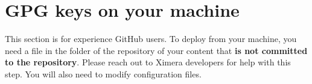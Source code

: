 \documentclass{ximera}
\begin{document}
\pdfOnly{\twocolumn} %

\section{GPG keys on your machine}

This section is for experience GitHub users. To deploy from your machine, you need a file in
the folder of the repository of
your content that \textbf{is not committed to the repository}. Please reach out
to Ximera developers for help with this step. You will also need to modify
configuration files.

\end{document}
